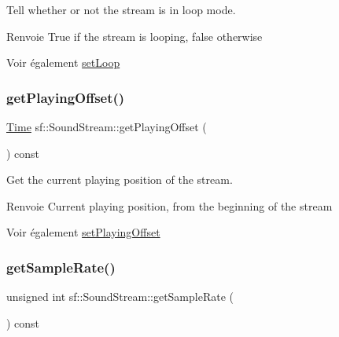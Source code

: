 Tell whether or not the stream is in loop mode. 

\begin{DoxyReturn}{Renvoie}
True if the stream is looping, false otherwise
\end{DoxyReturn}
\begin{DoxySeeAlso}{Voir également}
\hyperlink{classsf_1_1SoundStream_a43fade018ffba7e4f847a9f00b353f3d}{set\+Loop} 
\end{DoxySeeAlso}
\mbox{\label{classsf_1_1SoundStream_ae288f3c72edbad9cc7ee938ce5b907c1}} 
\subsubsection{\texorpdfstring{get\+Playing\+Offset()}{getPlayingOffset()}}
{\footnotesize\ttfamily \hyperlink{classsf_1_1Time}{Time} sf\+::\+Sound\+Stream\+::get\+Playing\+Offset (\begin{DoxyParamCaption}{ }\end{DoxyParamCaption}) const}



Get the current playing position of the stream. 

\begin{DoxyReturn}{Renvoie}
Current playing position, from the beginning of the stream
\end{DoxyReturn}
\begin{DoxySeeAlso}{Voir également}
\hyperlink{classsf_1_1SoundStream_af416a5f84c8750d2acb9821d78bc8646}{set\+Playing\+Offset} 
\end{DoxySeeAlso}
\mbox{\label{classsf_1_1SoundStream_a7da448dc40d81a33b8dc555fbf0d3fbf}} 
\subsubsection{\texorpdfstring{get\+Sample\+Rate()}{getSampleRate()}}
{\footnotesize\ttfamily unsigned int sf\+::\+Sound\+Stream\+::get\+Sample\+Rate (\begin{DoxyParamCaption}{ }\end{DoxyParamCaption}) const}



